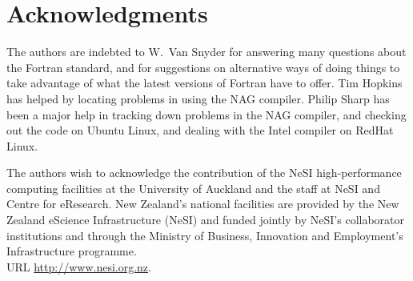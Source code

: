 \documentclass[12pt]{article}
\begin{document}
\section{Acknowledgments}
\label{sec:acknowledgments}

The authors are indebted to W.\ Van Snyder for answering many questions about
the Fortran standard, and for suggestions on alternative ways of doing things to
take advantage of what the latest versions of Fortran have to offer.  Tim
Hopkins has helped by locating problems in using the NAG compiler.  Philip Sharp
has been a major help in tracking down problems in the NAG compiler, and
checking out the code on Ubuntu Linux, and dealing with the Intel compiler on
RedHat Linux.


The authors wish to acknowledge the contribution of the NeSI high-performance
computing facilities at the University of Auckland and the staff at NeSI and
Centre for eResearch. New Zealand's national facilities are provided by the New
Zealand eScience Infrastructure (NeSI) and funded jointly by NeSI's collaborator
institutions and through the Ministry of Business, Innovation and Employment's
Infrastructure programme.\\ URL \url{http://www.nesi.org.nz}.


\end{document}
